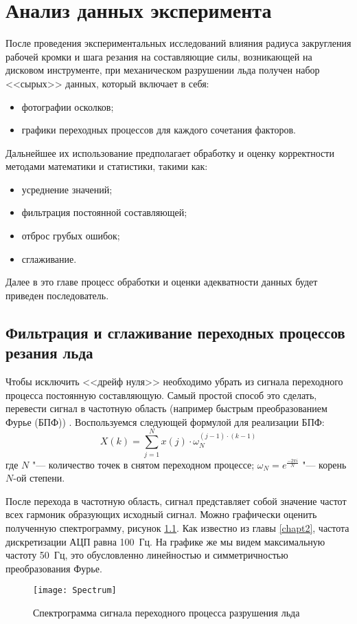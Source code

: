 \chapter{Анализ данных эксперимента}

После проведения экспериментальных исследований влияния радиуса закругления рабочей кромки и шага резания на составляющие силы, возникающей на дисковом инструменте, при механическом разрушении льда получен набор <<сырых>> данных, который включает в себя:
\begin{itemize}
	\item фотографии осколков;
	\item графики переходных процессов для каждого сочетания факторов.
\end{itemize}

Дальнейшее их использование предполагает обработку и оценку корректности методами математики и статистики, такими как:
\begin{itemize}
	\item усреднение значений;
	\item фильтрация постоянной составляющей;
	\item отброс грубых ошибок;
	\item сглаживание.
\end{itemize}

Далее в это главе процесс обработки и оценки адекватности данных будет приведен последователь.

\section{Фильтрация и сглаживание переходных процессов резания льда}

Чтобы исключить <<дрейф нуля>> необходимо убрать из сигнала переходного процесса постоянную составляющую. Самый простой способ это сделать, перевести сигнал в частотную область (например быстрым преобразованием Фурье (БПФ)) \cite{BPF,BPFEng}. Воспользуемся следующей формулой для реализации БПФ:
\begin{equation}\label{eq:FFT}
X(k)=\sum_{j=1}^{N} x(j)\cdot\omega_{N}^{(j-1)\cdot(k-1)}
\end{equation}
где $ N $ "--- количество точек в снятом переходном процессе; $ \omega_{N} = e^{\frac{-2\pi i}{N}} $ "--- корень $ N $-ой степени.

После перехода в частотную область, сигнал представляет собой значение частот всех гармоник образующих исходный сигнал. Можно графически оценить полученную спектрограмму, рисунок \ref{img:Spectrum}. Как известно из главы \ref{chapt2}, частота дискретизации АЦП равна 100~Гц. На графике же мы видем максимальную частоту 50~Гц, это обусловленно линейностью и симметричностью преобразования Фурье. 
\begin{figure}[ht] 
	\center
	\texttt{[image: Spectrum]}
	\caption{Спектрограмма сигнала переходного процесса разрушения льда} 
	\label{img:Spectrum}  
\end{figure}


